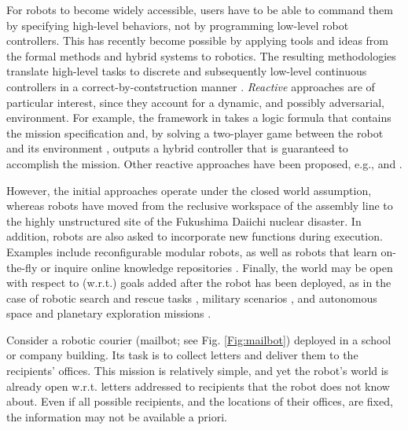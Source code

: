 For robots to become widely accessible, users have to be able to command them by specifying high-level behaviors, not by programming low-level robot controllers.
This has recently become possible by applying tools and ideas from the formal methods and hybrid systems to robotics. The resulting methodologies translate high-level tasks to discrete and subsequently low-level continuous controllers in a correct-by-contstruction manner \cite{BBEFKP06}.
\emph{Reactive} approaches are of particular interest, since they account for a dynamic, and possibly adversarial, environment. For example, the framework in \cite{KGFP_TRO09} takes a logic formula that contains the mission specification and, by solving a two-player game between the robot and its environment \cite{piterman_06}, outputs a hybrid controller that is guaranteed to accomplish the mission. Other reactive approaches have been proposed, e.g., \cite{Wongpiromsarn2010} and \cite{Belta2013RSS}.

However, the initial approaches operate under the closed world assumption, whereas robots have moved from the reclusive workspace of the assembly line to the highly unstructured site of the Fukushima Daiichi nuclear disaster. 
In addition, robots are also asked to incorporate new functions during execution. 
Examples include reconfigurable modular robots, as well as robots that learn on-the-fly \cite{SaxenaIJRR2012} or inquire online knowledge repositories \cite{rapyuta2013}. 
Finally, the world may be open with respect to (w.r.t.) goals added after the robot has been deployed, as in the case of robotic search and rescue tasks \cite{MatthiasAI2010}, military scenarios \cite{gda2013}, and autonomous space and planetary exploration missions \cite{spaceXplore2006}. 

\begin{myExample}\label{Ex:mailbot1}
Consider a robotic courier (mailbot; see Fig. \ref{Fig:mailbot}) deployed in a school or company building. 
Its task is to collect letters and deliver them to the recipients' offices. 
This mission is relatively simple, and yet the robot's world is already open w.r.t. letters addressed to recipients that the robot does not know about. %
Even if all possible recipients, and the locations of their offices, are fixed, the information may not be available a priori.
\end{myExample}

